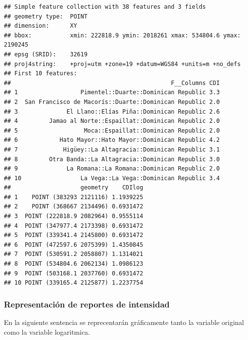 \documentclass[11pt,]{article}
\begin{document}
\begin{verbatim}
## Simple feature collection with 38 features and 3 fields
## geometry type:  POINT
## dimension:      XY
## bbox:           xmin: 222818.9 ymin: 2018261 xmax: 534804.6 ymax: 2190245
## epsg (SRID):    32619
## proj4string:    +proj=utm +zone=19 +datum=WGS84 +units=m +no_defs
## First 10 features:
##                                              F__Columns CDI
## 1                  Pimentel::Duarte::Dominican Republic 3.3
## 2  San Francisco de Macorís::Duarte::Dominican Republic 2.0
## 3              El Llano::Elías Piña::Dominican Republic 2.6
## 4         Jamao al Norte::Espaillat::Dominican Republic 2.0
## 5                   Moca::Espaillat::Dominican Republic 2.0
## 6            Hato Mayor::Hato Mayor::Dominican Republic 4.2
## 7             Higüey::La Altagracia::Dominican Republic 3.1
## 8         Otra Banda::La Altagracia::Dominican Republic 3.0
## 9              La Romana::La Romana::Dominican Republic 2.0
## 10                 La Vega::La Vega::Dominican Republic 3.4
##                    geometry    CDIlog
## 1    POINT (383293 2121116) 1.1939225
## 2    POINT (368667 2134496) 0.6931472
## 3  POINT (222818.9 2082964) 0.9555114
## 4  POINT (347977.4 2173398) 0.6931472
## 5  POINT (339341.4 2145800) 0.6931472
## 6  POINT (472597.6 2075399) 1.4350845
## 7  POINT (530591.2 2058807) 1.1314021
## 8  POINT (534804.6 2062134) 1.0986123
## 9  POINT (503168.1 2037760) 0.6931472
## 10 POINT (339165.4 2125877) 1.2237754
\end{verbatim}

\subsubsection{Representación de reportes de
intensidad}\label{representaciuxf3n-de-reportes-de-intensidad}

En la siguiente sentencia se reprecentarán gráficamente tanto la
variable original como la variable logaritmica.
\end{document}
